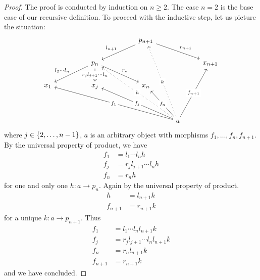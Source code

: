 \begin{proof}
  The proof is conducted by induction on \(n \ge 2\). The case \(n=2\) is
  the base case of our recursive definition. To proceed with the
  inductive step, let us picture the situation:
  \[\begin{tikzcd}
      & & & & p_{n+1} \ar["{l_{n+1}}", dll, swap] \ar["{r_{n+1}}", drr] \\
      & & p_n \ar["{l_2\cdots{}l_n}", dll, swap] \ar["{r_jl_{j+1}\cdots{}l_n}" description, d] \ar["{r_n}", drr] & & & & x_{n+1} \\
      x_1 & & x_j & & x_n \\
      \\
      & & & & & a \ar["{f_1}" description, uulllll] \ar["{f_j}"
      description, uulll] \ar["h" description, uuulll, dotted]
      \ar["{f_n}" description, uul] \ar["k" description, uuuul, dotted]
      \ar["{f_{n+1}}" description, uuur]
    \end{tikzcd}\] where \(j \in \left\{2, \dots{}, n-1\right\}\), \(a\) is an
  arbitrary object with morphisms \(f_1, \dots{}, f_n, f_{n+1}\). By the
  universal property of product, we have
  \[\begin{aligned}
    f_1 &= l_1 \cdots{} l_n h \\
    f_j &= r_jl_{j+1} \cdots{} l_n h \\
    f_n &= r_n h
  \end{aligned}\]
for one and only one \(h : a \to p_n\). Again by the universal property of product.
\[\begin{aligned}
  h &= l_{n+1} k \\
  f_{n+1} &= r_{n+1} k
\end{aligned}\]
for a unique \(k : a \to p_{n+1}\). Thus
\[\begin{aligned}
  f_1 &= l_1 \cdots{} l_n l_{n+1} k \\
  f_j &= r_jl_{j+1} \cdots{} l_n l_{n+1} k \\
  f_n &= r_n l_{n+1} k \\
  f_{n+1} &= r_{n+1} k
\end{aligned}\]
and we have concluded.
\end{proof}

